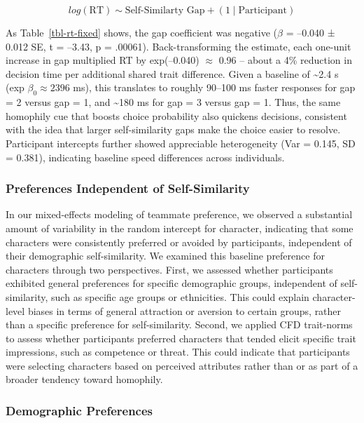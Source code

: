 \documentclass[
  man,
  floatsintext,
  longtable,
  nolmodern,
  notxfonts,
  notimes,
  draftfirst,
  colorlinks=true,linkcolor=blue,citecolor=blue,urlcolor=blue]{apa7}
\begin{document}
\[
log(\mathrm{RT}) \sim \text{Self-Similarty Gap} + ( 1\mid\text{Participant})
\]

As Table~\ref{tbl-rt-fixed} shows, the gap coefficient was negative
(\(\beta\) = --0.040 ± 0.012 SE, t = --3.43, p = .00061).
Back-transforming the estimate, each one-unit increase in gap multiplied
RT by exp(--0.040) \(\approx\) 0.96 -- about a 4\% reduction in decision
time per additional shared trait difference. Given a baseline of
\textasciitilde2.4 s (exp \(\beta_0 \approx 2 396\) ms), this translates
to roughly 90--100 ms faster responses for gap = 2 versus gap = 1, and
\textasciitilde180 ms for gap = 3 versus gap = 1. Thus, the same
homophily cue that boosts choice probability also quickens decisions,
consistent with the idea that larger self-similarity gaps make the
choice easier to resolve. Participant intercepts further showed
appreciable heterogeneity (Var = 0.145, SD = 0.381), indicating baseline
speed differences across individuals.

\subsubsection{Preferences Independent of
Self-Similarity}\label{preferences-independent-of-self-similarity}

In our mixed-effects modeling of teammate preference, we observed a
substantial amount of variability in the random intercept for character,
indicating that some characters were consistently preferred or avoided
by participants, independent of their demographic self-similarity. We
examined this baseline preference for characters through two
perspectives. First, we assessed whether participants exhibited general
preferences for specific demographic groups, independent of
self-similarity, such as specific age groups or ethnicities. This could
explain character-level biases in terms of general attraction or
aversion to certain groups, rather than a specific preference for
self-similarity. Second, we applied CFD trait-norms to assess whether
participants preferred characters that tended elicit specific trait
impressions, such as competence or threat. This could indicate that
participants were selecting characters based on perceived attributes
rather than or as part of a broader tendency toward homophily.

\subsubsection{Demographic Preferences}\label{demographic-preferences}
\end{document}
